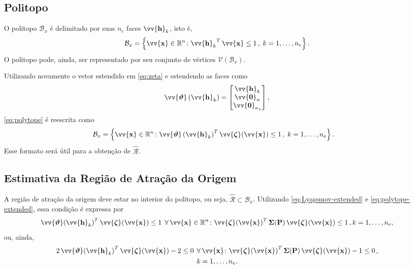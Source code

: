 \documentclass{ppgeesa}
\newcommand*{\Round}[1]{\left(#1\right)}
\newcommand*{\Curly}[1]{\left\{#1\right\}}
\newcommand*{\Set}[1]{\Curly{#1}}
\newcommand*{\Prod}{\,}
\newcommand*{\Bold}[1]{\boldsymbol{\mathbf{#1}}}
\newcommand*{\Matr}[1]{\Bold{#1}}
\newcommand*{\Vect}[1]{\vv{\Bold{#1}}}
\newcommand*{\Transp}[1]{{#1}^{T}}
\newcommand*{\ForAll}{\:\:\forall\,}
\begin{document}
\subsection{Politopo}
O politopo $\mathcal{B}_x$ é delimitado por suas $n_e$ faces $\Vect{h}_k$, isto é,
\begin{equation}\label{eq:polytope}
  \mathcal{B}_x
  = \Set{\Vect{x} \in \mathbb{R}^n \colon \Transp{\Vect{h}_k} \Prod \Vect{x} \leq 1 \,,\; k = 1, \dotsc, n_e}
  .
\end{equation}
O politopo pode, ainda, ser representado por seu conjunto de vértices $\mathcal{V}(\mathcal{B}_x)$.

Utilizando novamente o vetor estendido em \eqref{eq:zeta} e estendendo as faces como
\begin{equation}
  \Vect{\vartheta}\Round{\Vect{h}_k} = \begin{bmatrix} \Vect{h}_k \\ \Vect{0}_n \\ \Vect{0}_{n_z} \end{bmatrix}
  ,
\end{equation}
\eqref{eq:polytope} é reescrita como
\begin{equation}\label{eq:polytope-extended}
  \begin{aligned}
    \mathcal{B}_x
    &= \Set{\Vect{x} \in \mathbb{R}^n \colon \Transp{\Vect{\vartheta}\Round{\Vect{h}_k}} \Prod \Vect{\zeta}(\Vect{x}) \leq 1 \,,\; k = 1, \dotsc, n_e}
    .
  \end{aligned}
\end{equation}
Esse formato será útil para a obtenção de $\hat{\mathcal{R}}$.

\subsection{Estimativa da Região de Atração da Origem}
A região de atração da origem deve estar no interior do politopo, ou seja, $\hat{\mathcal{R}} \subset \mathcal{B}_x$.
Utilizando \eqref{eq:Lyapunov-extended} e \eqref{eq:polytope-extended}, essa condição é expressa por
\begin{equation}
  \Transp{\Vect{\vartheta}(\Vect{h}_k)} \Prod \Vect{\zeta}(\Vect{x}) \leq 1
  \ForAll \Vect{x} \in \mathbb{R}^n \colon \Transp{\Vect{\zeta}(\Vect{x})} \Prod \Matr{\Sigma}(\Matr{P}) \Prod \Vect{\zeta}(\Vect{x}) \leq 1
  \,,\\ k = 1, \dotsc, n_e
  ,
\end{equation}
ou, ainda,
\begin{equation}\label{eq:region-attraction-pre-S}
  \begin{gathered}
    2 \Prod \Transp{\Vect{\vartheta}(\Vect{h}_k)} \Prod \Vect{\zeta}(\Vect{x}) - 2 \leq 0
    \ForAll \Vect{x} \colon \Transp{\Vect{\zeta}(\Vect{x})} \Prod \Matr{\Sigma}(\Matr{P}) \Prod \Vect{\zeta}(\Vect{x}) -1 \leq 0
    \,,\\ k = 1, \dotsc, n_e
    .
  \end{gathered}
\end{equation}
\end{document}
